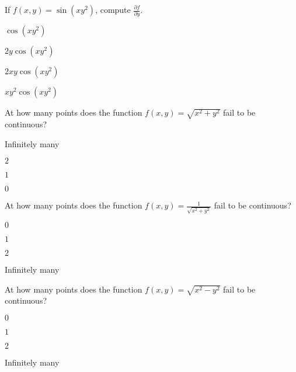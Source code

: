 \begin{readinessAssuranceTest}
\item If \(f(x,y) = \sin(xy^2)\), compute \(\frac{\partial f}{\partial y}\).
\begin{multicols}{4}
\begin{readinessAssuranceTestChoices}
\item \(\cos(xy^2)\) 
\item \(2y\cos(xy^2)\) 
\item \(2xy\cos(xy^2)\)  %
\item \(xy^2\cos(xy^2)\) 
\end{readinessAssuranceTestChoices}
\end{multicols}
\vfill

\newpage

\item At how many points does the function \(f(x,y)=\sqrt{x^2+y^2}\) fail to be continuous?
\begin{multicols}{4}
\begin{readinessAssuranceTestChoices}
\item Infinitely many
\item \(2\) 
\item \(1\)  
\item \(0\) %
\end{readinessAssuranceTestChoices}
\end{multicols}
\vfill


\item At how many points does the function \(f(x,y)=\frac{1}{\sqrt{x^2+y^2}}\) fail to be continuous?
\begin{multicols}{4}
\begin{readinessAssuranceTestChoices}
\item \(0\) 
\item \(1\) %
\item \(2\) 
\item Infinitely many
\end{readinessAssuranceTestChoices}
\end{multicols}
\vfill

\item At how many points does the function \(f(x,y)=\sqrt{x^2-y^2}\) fail to be continuous?
\begin{multicols}{4}
\begin{readinessAssuranceTestChoices}
\item \(0\) 
\item \(1\) 
\item \(2\) 
\item Infinitely many %
\end{readinessAssuranceTestChoices}
\end{multicols}
\vfill


\end{readinessAssuranceTest}
